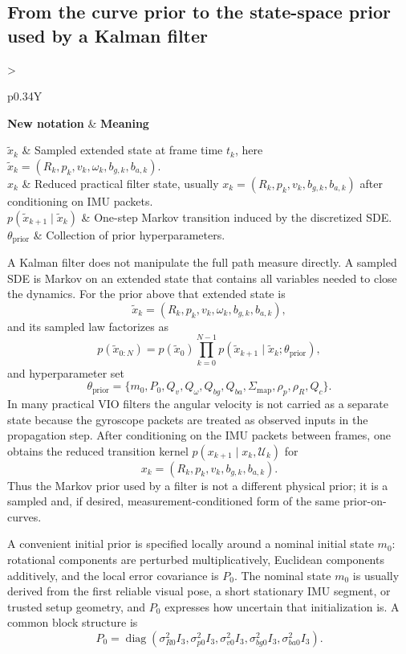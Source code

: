 \documentclass[11pt]{report}
\newcommand{\diag}{\operatorname{diag}}
\newcommand{\NotationTable}[1]{%
\vspace{0.6mm}
{\scriptsize
\setlength{\tabcolsep}{2.5pt}
\begin{tabularx}{\columnwidth}{>{\raggedright\arraybackslash}p{0.34\columnwidth}Y}
\toprule
\textbf{New notation} & \textbf{Meaning}\\
\midrule
#1\\
\bottomrule
\end{tabularx}}
\vspace{0.8mm}}
\begin{document}
\subsection{From the curve prior to the state-space prior used by a Kalman filter}
\NotationTable{
$\tilde x_k$ & Sampled extended state at frame time $t_k$, here $\tilde x_k=(R_k,p_k,v_k,\omega_k,b_{g,k},b_{a,k})$.\\
$x_k$ & Reduced practical filter state, usually $x_k=(R_k,p_k,v_k,b_{g,k},b_{a,k})$ after conditioning on IMU packets.\\
$p(\tilde x_{k+1}\mid \tilde x_k)$ & One-step Markov transition induced by the discretized SDE.\\
$\theta_{\mathrm{prior}}$ & Collection of prior hyperparameters.}

A Kalman filter does not manipulate the full path measure directly. A sampled SDE is Markov on an extended state that contains all variables needed to close the dynamics. For the prior above that extended state is
\begin{equation}
\tilde x_k=(R_k,p_k,v_k,\omega_k,b_{g,k},b_{a,k}),
\end{equation}
and its sampled law factorizes as
\begin{equation}
 p(\tilde x_{0:N})=p(\tilde x_0)\prod_{k=0}^{N-1}p(\tilde x_{k+1}\mid \tilde x_k;\theta_{\mathrm{prior}}),
\label{eq:markov_factorization_from_curve}
\end{equation}
and hyperparameter set
\begin{equation}
\theta_{\mathrm{prior}}=\{m_0,P_0,Q_v,Q_\omega,Q_{bg},Q_{ba},\Sigma_{\mathrm{map}},\rho_p,\rho_R,Q_c\}.
\end{equation}
In many practical VIO filters the angular velocity is not carried as a separate state because the gyroscope packets are treated as observed inputs in the propagation step. After conditioning on the IMU packets between frames, one obtains the reduced transition kernel $p(x_{k+1}\mid x_k,\mathcal U_k)$ for
\begin{equation}
 x_k=(R_k,p_k,v_k,b_{g,k},b_{a,k}).
\end{equation}
Thus the Markov prior used by a filter is not a different physical prior; it is a sampled and, if desired, measurement-conditioned form of the same prior-on-curves.

A convenient initial prior is specified locally around a nominal initial state $m_0$: rotational components are perturbed multiplicatively, Euclidean components additively, and the local error covariance is $P_0$. The nominal state $m_0$ is usually derived from the first reliable visual pose, a short stationary IMU segment, or trusted setup geometry, and $P_0$ expresses how uncertain that initialization is. A common block structure is
\begin{equation}
P_0=\diag(\sigma_{R0}^2I_3,\sigma_{p0}^2I_3,\sigma_{v0}^2I_3,\sigma_{bg0}^2I_3,\sigma_{ba0}^2I_3).
\end{equation}
\end{document}

